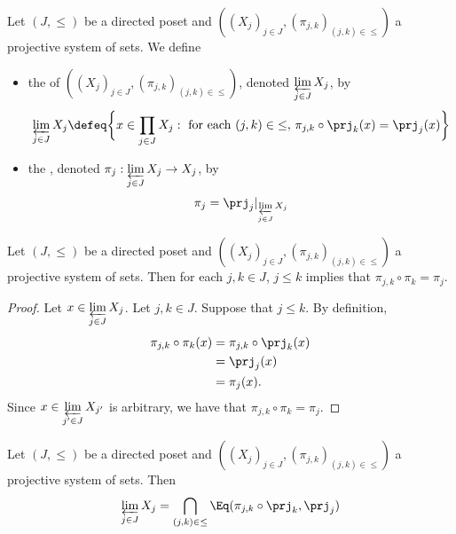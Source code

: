 \documentclass{book}
\begin{document}
\begin{defn} 
	Let $(J, \leq)$ be a directed poset and $((X_j)_{j \in J}, (\pi_{j,k})_{(j,k) \in \leq})$ a projective system of sets. We define 
	\begin{itemize}
		\item the  of $((X_j)_{j \in J}, (\pi_{j,k})_{(j,k) \in \leq})$, denoted $\varprojlim\limits_{j \in J} X_j$, by 
		$$\varprojlim\limits_{j \in J} X_j \defeq \bigg\{ x \in \prod\limits_{j \in J} X_j: \text{ for each $(j,k) \in {\leq}$, $\pi_{j,k} \circ \prj_k(x) = \prj_j(x) $} \bigg \}$$
		\item the , denoted $\pi_j: \varprojlim\limits_{j \in J} X_j \rightarrow X_j$, by 
		$$\pi_j = \prj_j|_{\varprojlim\limits_{j \in J} X_j}$$
	\end{itemize}
\end{defn}

\begin{ex} 
	Let $(J, \leq)$ be a directed poset and $((X_j)_{j \in J}, (\pi_{j,k})_{(j,k) \in \leq})$ a projective system of sets. Then for each $j,k \in J$, $j \leq k$ implies that $\pi_{j,k} \circ \pi_k = \pi_j$. 
\end{ex}

\begin{proof}
	Let $x \in \varprojlim\limits_{j \in J} X_j$. Let $j,k \in J$. Suppose that $j \leq k$.  By definition, 
	\begin{align*}
		\pi_{j,k} \circ \pi_k(x)
		& = \pi_{j,k} \circ \prj_k(x) \\
		& = \prj_j(x) \\
		& = \pi_j(x).
	\end{align*}
	Since $x \in \varprojlim\limits_{j' \in J} X_{j'}$ is arbitrary, we have that $\pi_{j,k} \circ \pi_k = \pi_j$. 
\end{proof}

\begin{ex} 
	Let $(J, \leq)$ be a directed poset and $((X_j)_{j \in J}, (\pi_{j,k})_{(j,k) \in \leq})$ a projective system of sets. Then 
	$$\varprojlim\limits_{j \in J} X_j = \bigcap\limits_{(j,k) \in {\leq}} \Eq(\pi_{j,k} \circ \prj_k, \prj_j)$$
\end{ex}
\end{document}

